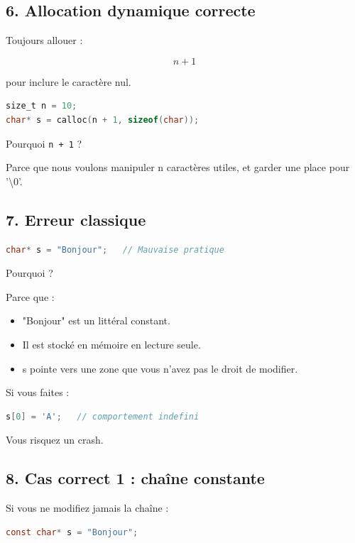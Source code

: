 \subsection{6. Allocation dynamique correcte}

Toujours allouer :

\[
n + 1
\]

pour inclure le caractère nul.

\begin{lstlisting}[language=C]
size_t n = 10;
char* s = calloc(n + 1, sizeof(char));
\end{lstlisting}

Pourquoi \texttt{n + 1} ?

Parce que nous voulons manipuler n caractères utiles,
et garder une place pour '\textbackslash 0'.

\subsection{7. Erreur classique}

\begin{lstlisting}[language=C]
char* s = "Bonjour";   // Mauvaise pratique
\end{lstlisting}

Pourquoi ?

Parce que :

\begin{itemize}
\item "Bonjour" est un littéral constant.
\item Il est stocké en mémoire en lecture seule.
\item s pointe vers une zone que vous n’avez pas le droit de modifier.
\end{itemize}

Si vous faites :

\begin{lstlisting}[language=C]
s[0] = 'A';   // comportement indefini
\end{lstlisting}

Vous risquez un crash.

\subsection{8. Cas correct 1 : chaîne constante}

Si vous ne modifiez jamais la chaîne :

\begin{lstlisting}[language=C]
const char* s = "Bonjour";
\end{lstlisting}

